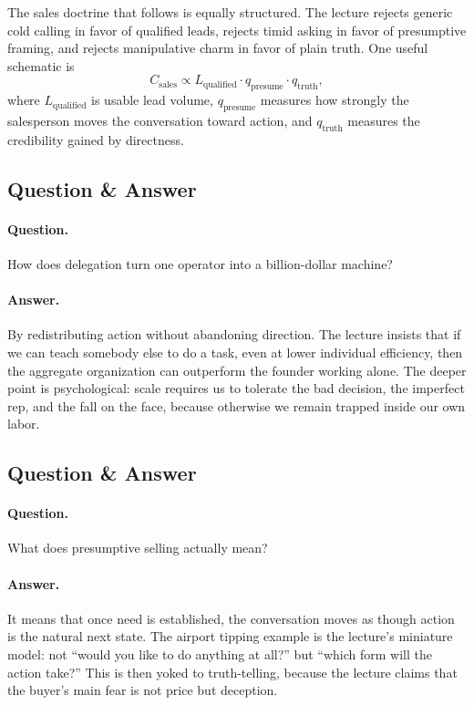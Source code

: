 The sales doctrine that follows is equally structured. The lecture rejects generic cold calling in favor of qualified leads, rejects timid asking in favor of presumptive framing, and rejects manipulative charm in favor of plain truth. One useful schematic is
\begin{equation}
C_{\mathrm{sales}}\propto L_{\mathrm{qualified}}\cdot q_{\mathrm{presume}}\cdot q_{\mathrm{truth}},
\end{equation}
where \(L_{\mathrm{qualified}}\) is usable lead volume, \(q_{\mathrm{presume}}\) measures how strongly the salesperson moves the conversation toward action, and \(q_{\mathrm{truth}}\) measures the credibility gained by directness.

\subsection{Question \& Answer}

\paragraph{Question.} How does delegation turn one operator into a billion-dollar machine?

\paragraph{Answer.} By redistributing action without abandoning direction. The lecture insists that if we can teach somebody else to do a task, even at lower individual efficiency, then the aggregate organization can outperform the founder working alone. The deeper point is psychological: scale requires us to tolerate the bad decision, the imperfect rep, and the fall on the face, because otherwise we remain trapped inside our own labor.

\subsection{Question \& Answer}

\paragraph{Question.} What does presumptive selling actually mean?

\paragraph{Answer.} It means that once need is established, the conversation moves as though action is the natural next state. The airport tipping example is the lecture's miniature model: not ``would you like to do anything at all?'' but ``which form will the action take?'' This is then yoked to truth-telling, because the lecture claims that the buyer's main fear is not price but deception.

